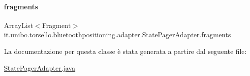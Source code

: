 \hypertarget{classit_1_1unibo_1_1torsello_1_1bluetoothpositioning_1_1adapter_1_1StatePagerAdapter_a6d30ff8266b65b268d46d03eb30da1db_a6d30ff8266b65b268d46d03eb30da1db}{}\label{classit_1_1unibo_1_1torsello_1_1bluetoothpositioning_1_1adapter_1_1StatePagerAdapter_a6d30ff8266b65b268d46d03eb30da1db_a6d30ff8266b65b268d46d03eb30da1db} 
\paragraph{\texorpdfstring{fragments}{fragments}}
{\footnotesize\ttfamily Array\+List$<$Fragment$>$ it.\+unibo.\+torsello.\+bluetoothpositioning.\+adapter.\+State\+Pager\+Adapter.\+fragments\hspace{0.3cm}{\ttfamily [private]}}



La documentazione per questa classe è stata generata a partire dal seguente file\+:\begin{DoxyCompactItemize}
\item 
\hyperlink{StatePagerAdapter_8java}{State\+Pager\+Adapter.\+java}\end{DoxyCompactItemize}
